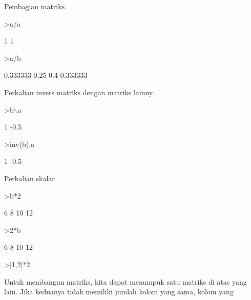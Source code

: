 \documentclass[a4paper,10pt]{article}
\begin{document}
\begin{eulernotebook}
\begin{eulercomment}
\begin{eulercomment}
\begin{eulercomment}
\begin{eulercomment}
\begin{eulercomment}
Pembagian matriks
\end{eulercomment}
\begin{eulerprompt}
>a/a
\end{eulerprompt}
\begin{euleroutput}
              1 
              1 
\end{euleroutput}
\begin{eulerprompt}
>a/b
\end{eulerprompt}
\begin{euleroutput}
       0.333333          0.25 
            0.4      0.333333 
\end{euleroutput}
\begin{eulercomment}
Perkalian invers matriks dengan matriks lainny
\end{eulercomment}
\begin{eulerprompt}
>b\(\backslash\)a
\end{eulerprompt}
\begin{euleroutput}
              1 
           -0.5 
\end{euleroutput}
\begin{eulerprompt}
>inv(b).a
\end{eulerprompt}
\begin{euleroutput}
              1 
           -0.5 
\end{euleroutput}
\begin{eulercomment}
Perkalian skalar
\end{eulercomment}
\begin{eulerprompt}
>b*2
\end{eulerprompt}
\begin{euleroutput}
              6             8 
             10            12 
\end{euleroutput}
\begin{eulerprompt}
>2*b
\end{eulerprompt}
\begin{euleroutput}
              6             8 
             10            12 
\end{euleroutput}
\begin{eulerprompt}
>[1,2]*2
\end{eulerprompt}
\begin{euleroutput}
  [2,  4]
\end{euleroutput}
\begin{eulercomment}
Untuk membangun matriks, kita dapat menumpuk satu matriks di atas yang
lain. Jika keduanya tidak memiliki jumlah kolom yang sama, kolom yang

\end{eulercomment}
\end{eulercomment}
\end{eulercomment}
\end{eulercomment}
\end{eulercomment}
\end{eulernotebook}
\end{document}
